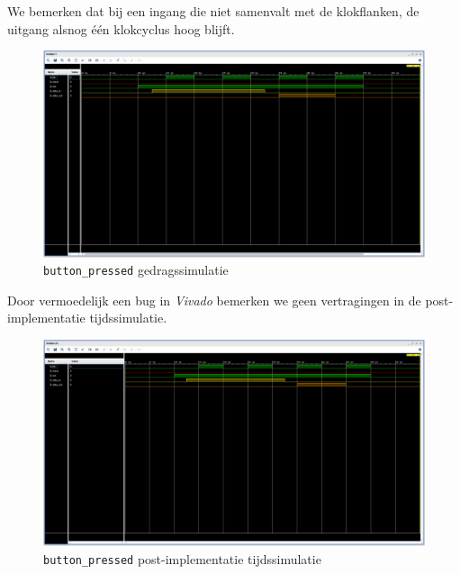 \documentclass[titlepage]{article}
\begin{document}
We bemerken dat bij een ingang die niet samenvalt met de klokflanken,
de uitgang alsnog één klokcyclus hoog blijft.

\begin{figure}[h!]
    \centering
    \includegraphics[trim={0 500px 0 0}, clip, width=0.8\linewidth]{button_pressed_gedragssimulatie.PNG}
    \caption{\texttt{button\_pressed} gedragssimulatie}
    \label{fig:button_pressed_gedragssimulatie}
\end{figure}

Door vermoedelijk een bug in \textit{Vivado} bemerken we geen vertragingen in de post-implementatie tijdssimulatie.

\begin{figure}[h!]
    \centering
    \includegraphics[trim={0 500px 0 0}, clip, width=0.8\linewidth]{button_pressed_tijdssimulatie.PNG}
    \caption{\texttt{button\_pressed} post-implementatie tijdssimulatie}
    \label{fig:button_pressed_tijdssimulatie}
\end{figure}
\end{document}
